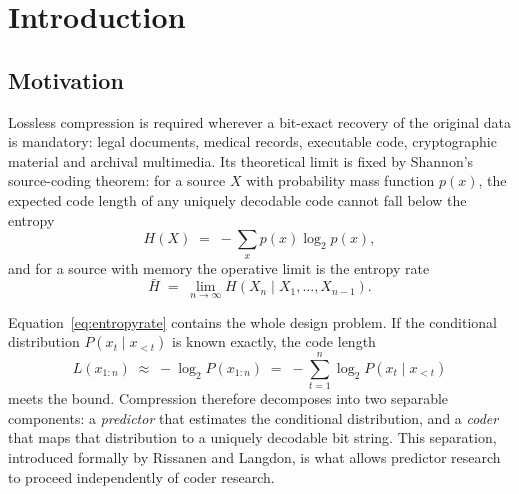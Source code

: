 \documentclass[11pt,a4paper]{article}
\begin{document}
\begin{abstract}
All four classical baselines families reproduce, and the video baselines agree
most closely of any modality (largest discrepancy \num{1.17}\,pp; FFV1 and zstd
within \num{0.01}\,pp). Because three of our own intermediate claims were later
falsified by our own verification tooling, this report records every retraction
explicitly and ships a machine-checkable verifier so that readers can re-derive
rather than trust the numbers.

\vspace{0.8em}
\noindent\textbf{Keywords:} lossless compression, large language models,
arithmetic coding, reproducibility, evaluation methodology.
\end{abstract}

\newpage
\tableofcontents
\newpage

\section{Introduction}

\subsection{Motivation}

Lossless compression is required wherever a bit-exact recovery of the original
data is mandatory: legal documents, medical records, executable code,
cryptographic material and archival multimedia. Its theoretical limit is fixed by
Shannon's source-coding theorem: for a source $X$ with probability mass function
$p(x)$, the expected code length of any uniquely decodable code cannot fall below
the entropy
\begin{equation}
H(X) \;=\; -\sum_x p(x)\log_2 p(x),
\end{equation}
and for a source with memory the operative limit is the entropy rate
\begin{equation}
\bar H \;=\; \lim_{n\to\infty} H\!\left(X_n \mid X_1,\dots,X_{n-1}\right).
\label{eq:entropyrate}
\end{equation}

Equation~\eqref{eq:entropyrate} contains the whole design problem. If the
conditional distribution $P(x_t \mid x_{<t})$ is known exactly, the code length
\begin{equation}
L(x_{1:n}) \;\approx\; -\log_2 P(x_{1:n})
\;=\; -\sum_{t=1}^{n} \log_2 P\!\left(x_t \mid x_{<t}\right)
\label{eq:chainrule}
\end{equation}
meets the bound. Compression therefore decomposes into two separable components:
a \emph{predictor} that estimates the conditional distribution, and a
\emph{coder} that maps that distribution to a uniquely decodable bit string. This
separation, introduced formally by Rissanen and Langdon, is what allows predictor
research to proceed independently of coder research.
\end{document}
